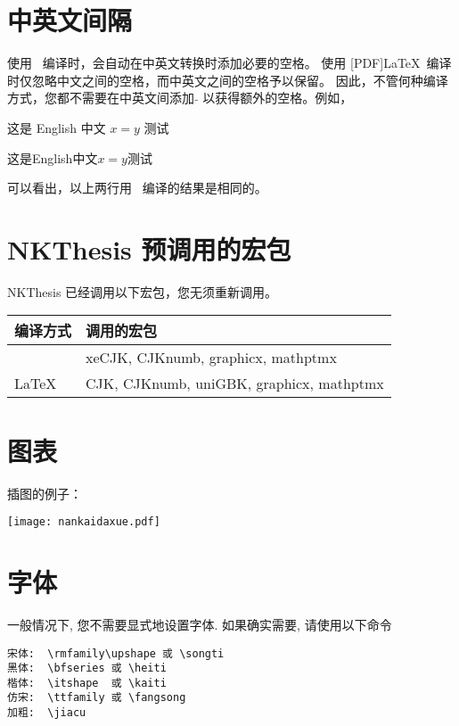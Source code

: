 \section{中英文间隔}

使用 \XeLaTeX\ 编译时，会自动在中英文转换时添加必要的空格。 使用 [PDF]\LaTeX\
编译时仅忽略中文之间的空格，而中英文之间的空格予以保留。
因此，不管何种编译方式，您都不需要在中英文间添加 $\tilde{}$ 以获得额外的空格。例如，

这是 English 中文 $x=y$ 测试

这是English中文$x=y$测试

可以看出，以上两行用 \XeLaTeX\ 编译的结果是相同的。


\section{NKThesis 预调用的宏包}

NKThesis 已经调用以下宏包，您无须重新调用。

\begin{center}
\begin{tabular}{l|l}
\hline
编译方式 & 调用的宏包\\ \hline
\XeLaTeX & xeCJK, CJKnumb, graphicx, mathptmx \\ \hline
[PDF]\LaTeX & CJK, CJKnumb, uniGBK, graphicx, mathptmx \\
\hline
\end{tabular}
\end{center}


\section{图表}

插图的例子：

\begin{center}
\texttt{[image: nankaidaxue.pdf]}
\end{center}

\section{字体}

一般情况下, 您不需要显式地设置字体. 如果确实需要, 请使用以下命令

\begin{verbatim}
宋体:  \rmfamily\upshape 或 \songti
黑体:  \bfseries 或 \heiti
楷体:  \itshape  或 \kaiti
仿宋:  \ttfamily 或 \fangsong
加粗:  \jiacu
\end{verbatim}


